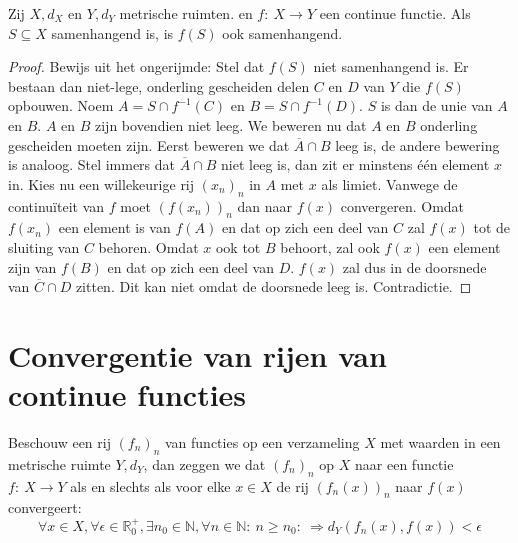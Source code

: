 \documentclass[main.tex]{subfiles}
\begin{document}
\begin{bst}
  Zij $X,d_{X}$ en $Y,d_{Y}$ metrische ruimten. en $f:\ X \rightarrow Y$ een continue functie.
  Als $S \subseteq X$ samenhangend is, is $f(S)$ ook samenhangend.

  \begin{proof}
    Bewijs uit het ongerijmde: Stel dat $f(S)$ niet samenhangend is.
    Er bestaan dan niet-lege, onderling gescheiden delen $C$ en $D$ van $Y$ die $f(S)$ opbouwen.
    Noem $A = S \cap f^{-1}(C)$ en $B= S \cap f^{-1}(D)$.
    $S$ is dan de unie van $A$ en $B$.
    $A$ en $B$ zijn bovendien niet leeg.
    We beweren nu dat $A$ en $B$ onderling gescheiden moeten zijn.
    Eerst beweren we dat $\overline{A} \cap B$ leeg is, de andere bewering is analoog.
    Stel immers dat $\overline{A} \cap B$ niet leeg is, dan zit er minstens \'e\'en element $x$ in.
    Kies nu een willekeurige rij $(x_{n})_{n}$ in $A$ met $x$ als limiet.
    Vanwege de continu\"iteit van $f$ moet $(f(x_{n}))_{n}$ dan naar $f(x)$ convergeren.
    Omdat $f(x_{n})$ een element is van $f(A)$ en dat op zich een deel van $C$ zal $f(x)$ tot de sluiting van $C$ behoren.
    Omdat $x$ ook tot $B$ behoort, zal ook $f(x)$ een element zijn van $f(B)$ en dat op zich een deel van $D$.
    $f(x)$ zal dus in de doorsnede van $\overline{C} \cap D$ zitten.
    Dit kan niet omdat de doorsnede leeg is.
    Contradictie.
  \end{proof}
\end{bst}


\section{Convergentie van rijen van continue functies}
\label{sec:conv-van-rijen}

\begin{de}
  \label{de:metrische-ruimten-puntsgewijze-convergentie-van-rij-functies}
  Beschouw een rij $(f_{n})_{n}$ van functies op een verzameling $X$ met waarden in een metrische ruimte $Y,d_{Y}$, dan zeggen we dat $(f_{n})_{n}$  op $X$ naar een functie $f:\ X \rightarrow Y$ als en slechts als voor elke $x\in X$ de rij $(f_{n}(x))_{n}$ naar $f(x)$ convergeert:
  \[ \forall x\in X, \forall \epsilon \in \mathbb{R}_{0}^{+}, \exists n_{0} \in \mathbb{N}, \forall n\in \mathbb{N}:\ n \ge n_{0}:\ \Rightarrow d_{Y}(f_{n}(x),f(x)) < \epsilon \]
\end{de}
\end{document}
